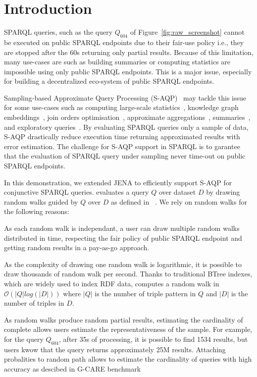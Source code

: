 
\section{Introduction}

SPARQL queries, such as the query $Q_{604}$ of Figure~\ref{fig:raw_screenshot} cannot be executed on public SPARQL
endpoints due to their fair-use policy i.e., they are stopped after the 60s
returning only partial results. Because of this limitation, many
use-cases are such as building summaries or computing statistics are
impossible using only public SPARQL endpoints. This is a major issue,
especially for building a decentralized eco-system of public SPARQL
endpoints.

Sampling-based Approximate Query Processing
(S-AQP)~\cite{DBLP:conf/sigmod/AgarwalMKTJMMS14} may tackle this issue
for some use-cases such as computing large-scale
statistics~\cite{soulet2019anytime,10.1007/978-3-319-18818-8_14},
knowledge graph embeddings~\cite{ristoski2016rdf2vec}, join orders
optimisation~\cite{DBLP:conf/cidr/LeisRGK017}, approximate
aggregations~\cite{wang2022approximate},
summaries~\cite{10.1007/978-3-030-49461-2_10}, and exploratory
queries~\cite{DBLP:conf/sigmod/AgarwalMKTJMMS14}. By evaluating SPARQL
queries only a sample of data, S-AQP drastically reduce execution time
returning approximated results with error estimation.  The challenge
for S-AQP support in SPARQL is to garantee that the evaluation of
SPARQL query under sampling never time-out on public SPARQL endpoints.

In this demonstration, we extended JENA to efficiently support S-AQP
for conjunctive SPARQL queries. \NAME evaluates a query $Q$ over
dataset $D$ by drawing  random walks guided by $Q$ over $D$ as defined in
\WANDER~\cite{li2019wanderjoin}. We rely on random walks for the
following reasons:
%
\begin{inparaenum}[(i)]
%
\item As each random walk is independant, a
user can draw multiple random walks distributed in time, respecting
the fair policy of public SPARQL endpoint and getting random results
in a pay-as-go approach.
%
\item As the complexity of drawing one random walk is logarithmic, it is
possible to draw thousands of random walk per second. Thanks to
traditional BTree indexes, which are widely used to index RDF data,
\NAME computes a random walk in $\mathcal{O}(|Q|log(|D|))$ where $|Q|$
is the number of triple pattern in $Q$ and $|D|$ is the number of
triples in $D$.
%
\item As random walks produce random partial results, estimating the
cardinality of complete allows users estimate the representativeness
of the sample. For example, for the query $Q_{604}$, after 35s of
processing, it is possible to find 1534 results, but users kwow that
the query returns approximately 25M results. Attaching probalities to random path allows to estimate
the cardinality of queries\cite{li2019wanderjoin} with high accuracy
as descibed in G-CARE benchmark~\cite{DBLP:conf/sigmod/ParkKBKHH20}
\end{inparaenum}


